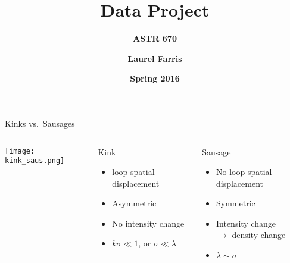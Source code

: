 \documentclass[table]{beamer}
\title{\textbf{Data Project}}
\subtitle{\textbf{ASTR 670}}
\date{\textbf{Spring 2016}}
\author{\textbf{Laurel Farris}}
\begin{document}
{
\begin{frame}
    \titlepage{}
\end{frame}}%

\begin{frame}{Kinks vs.\ Sausages}
\begin{columns}
        \texttt{[image: kink\_saus.png]}
        \begin{block}{Kink}
            \begin{itemize}
                \item loop spatial displacement
                \item Asymmetric
                \item No intensity change
                \item $k\sigma \ll 1$, or $\sigma\ll\lambda$
            \end{itemize}
        \end{block}
        \begin{block}{Sausage}
            \begin{itemize}
                \item No loop spatial displacement
                \item Symmetric
                \item Intensity change\\ $\rightarrow$ density change
                \item $\lambda\sim\sigma$
            \end{itemize}
        \end{block}
\end{columns}
\end{frame}%
\end{document}
